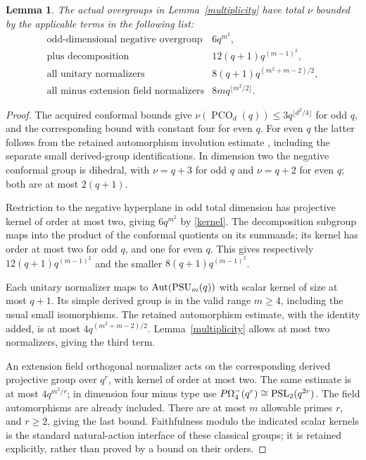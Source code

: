 \documentclass[11pt,a4paper]{article}
\newtheorem{lemma}{Lemma}\newtheorem{proposition}[lemma]{Proposition}
\newcommand{\PCO}{\operatorname{PCO}}\newcommand{\GU}{\operatorname{GU}}
\begin{document}
\begin{lemma}\label{overbound}
The actual overgroups in Lemma~\ref{multiplicity} have total $\nu$
bounded by the applicable terms in the following list:
\[
\begin{array}{ll}
\text{odd-dimensional negative overgroup}&6q^{m^2},\\
\text{plus decomposition}&12(q+1)q^{(m-1)^2},\\
\text{all unitary normalizers}&8(q+1)q^{(m^2+m-2)/2},\\
\text{all minus extension field normalizers}&8m q^{\lfloor m^2/2\rfloor}.
\end{array}                                                    \tag{7}
\]
\end{lemma}
\begin{proof}
The acquired conformal bounds give
$\nu(\PCO_d(q))\le3q^{\lfloor d^2/4\rfloor}$ for odd $q$, and
the corresponding bound with constant four for even $q$.
For even $q$ the latter follows from the retained automorphism
involution estimate \cite[Proposition~1.3]{LLS}, including the
separate small derived-group identifications. In dimension two the
negative conformal group is dihedral, with $\nu=q+3$ for odd $q$
and $\nu=q+2$ for even $q$; both are at most $2(q+1)$.

Restriction to the negative hyperplane in odd total dimension has
projective kernel of order at most two, giving $6q^{m^2}$ by
\eqref{kernel}. The decomposition subgroup maps into the product
of the conformal quotients on its summands; its kernel has order at
most two for odd $q$, and one for even $q$. This gives respectively
$12(q+1)q^{(m-1)^2}$ and the smaller $8(q+1)q^{(m-1)^2}$.

Each unitary normalizer maps to $\operatorname{Aut}(\operatorname{PSU}_m(q))$
with scalar kernel of size at most $q+1$. Its simple derived group
is in the valid range $m\ge4$, including the usual small isomorphisms.
The retained automorphism estimate, with the identity added, is at
most $4q^{(m^2+m-2)/2}$. Lemma~\ref{multiplicity} allows at most
two normalizers, giving the third term.

An extension field orthogonal normalizer acts on the corresponding
derived projective group over $q^r$, with kernel of order at most
two. The same estimate is at most $4q^{m^2/r}$; in dimension four
minus type use $P\Omega^-_4(q^r)\cong\operatorname{PSL}_2(q^{2r})$.
The field automorphisms are already included. There are at most
$m$ allowable primes $r$, and $r\ge2$, giving the last bound.
Faithfulness modulo the indicated scalar kernels is the standard
natural-action interface of these classical groups; it is retained
explicitly, rather than proved by a bound on their orders.
\end{proof}
\end{document}
